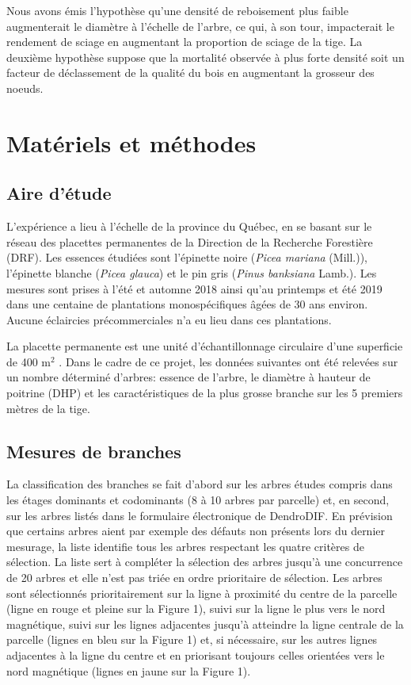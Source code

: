 \documentclass[letterpaper, 12pt]{article}
\begin{document}
\begin{onehalfspace}
Nous avons émis l'hypothèse qu'une densité de reboisement plus faible augmenterait le diamètre à l'échelle de l'arbre, ce qui, à son tour, impacterait le rendement de sciage en augmentant la proportion de sciage de la tige. La deuxième hypothèse suppose que la mortalité observée à plus forte densité soit un facteur de déclassement de la qualité du bois en augmentant la grosseur des noeuds. 

\section{Matériels et méthodes}

\subsection{Aire d'étude}

L'expérience a lieu à l'échelle de la province du Québec, en se basant sur le réseau des placettes permanentes de la Direction de la Recherche Forestière (DRF). Les essences étudiées sont l'épinette noire (\textit{Picea mariana} (Mill.)), l'épinette blanche (\textit{Picea glauca}) et le pin gris (\textit{Pinus banksiana} Lamb.). Les mesures sont prises à l'été et automne 2018 ainsi qu'au printemps et été 2019 dans une centaine de plantations monospécifiques âgées de 30 ans environ. Aucune éclaircies précommerciales n'a eu lieu dans ces plantations. 

La placette permanente est une unité d'échantillonnage circulaire d'une superficie de 400 m$^{2}$ \cite{MFFP2016}. Dans le cadre de ce projet, les données suivantes ont été relevées sur un nombre déterminé d'arbres: essence de l'arbre, le diamètre à hauteur de poitrine (DHP) et les caractéristiques de la plus grosse branche sur les 5 premiers mètres de la tige. 

\subsection{Mesures de branches}

La classification des branches se fait d’abord sur les arbres études compris dans les étages dominants et codominants (8 à 10 arbres par parcelle) et, en second, sur les arbres listés dans le formulaire électronique de DendroDIF. En prévision que certains arbres aient par exemple des défauts non présents lors du dernier mesurage, la liste identifie tous les arbres respectant les quatre critères de sélection. La liste sert à compléter la sélection des arbres jusqu’à une concurrence de 20 arbres et elle n’est pas triée en ordre prioritaire de sélection. Les arbres sont sélectionnés prioritairement sur la ligne à proximité du centre de la parcelle (ligne en rouge et pleine sur la Figure 1), suivi sur la ligne le plus vers le nord magnétique, suivi sur les lignes adjacentes jusqu’à atteindre la ligne centrale de la parcelle  (lignes en bleu sur la Figure 1) et, si nécessaire, sur les autres lignes adjacentes à la ligne du centre et en priorisant toujours celles orientées vers le nord magnétique (lignes en jaune sur la Figure 1).


\end{onehalfspace}
\end{document}
